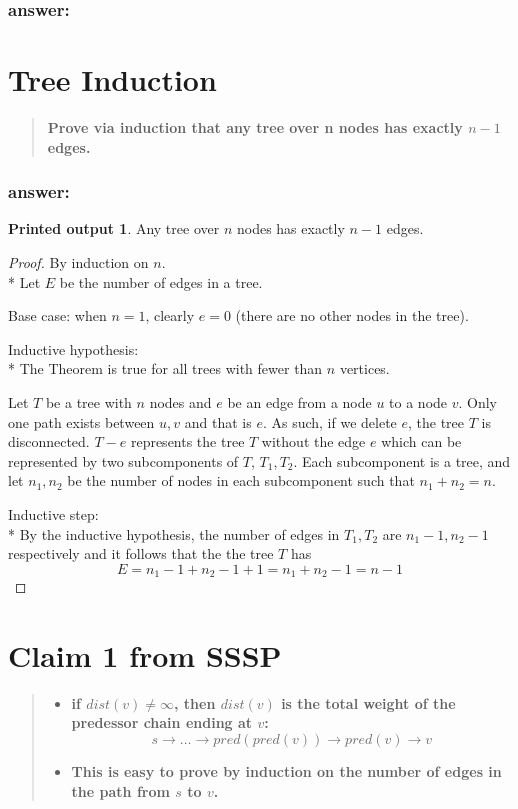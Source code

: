 \documentclass[titlepage]{article}\usepackage[]{graphicx}\usepackage[]{color}
\theoremstyle{definition}
\newtheorem{name}{Printed output}
\begin{document}
\subsubsection{answer:}
\vspace{8cm}


\section{Tree Induction}
\begin{quote}
  \textbf{Prove via induction that any tree over n nodes has exactly $n-1$
  edges. }
\end{quote}

\subsubsection{answer:}

\newtheorem{mydef}{Theorem}

\begin{name}
  Any tree over $n$ nodes has exactly $n-1$ edges.
\end{name}


\begin{proof}
By induction on $n$. \\*
Let $E$ be the number of edges in a tree.

Base case: when $n =1$, clearly $e = 0$ (there are no other nodes in the tree).

Inductive hypothesis: \\*
The Theorem is true for all trees with fewer than $ n$ vertices.

Let $T$ be a tree with $n$ nodes and $e$ be an edge from a node $u$ to a node
$v$. Only one path exists between $u,v$ and that is $e$. As such, if we delete $e$, the
tree $T$ is disconnected. $T - e$ represents the tree $T$ without the edge $e$
which can be represented by two subcomponents of $T$, $T_1, T_2$. Each
subcomponent is a tree, and let $n_1,n_2$ be the number of nodes in each
subcomponent such that $n_1 + n_2 = n$. 

Inductive step: \\*
By the inductive hypothesis, the number of edges in $T_1, T_2$ are $n_1-1,
n_2-1$
respectively and it follows that the the tree $T$ has 
\[ E = n_1 -1 + n_2 -1 +1 = n_1 + n_2-1 = n-1 \]
  \qedhere
\end{proof}


\section{Claim 1 from SSSP}
\begin{quote}
\begin{itemize}
  \item \textbf{if $dist(v) \neq \infty $, then $dist(v)$ is the total weight
	of the predessor chain ending at $v$:
  \[ s \rightarrow \dots \rightarrow pred(pred(v)) \rightarrow pred(v) \rightarrow v \] }
  \item \textbf{This is easy to prove by induction on the number of edges in
	the path from $s$ to $v$.}
\end{itemize}
\end{quote}
\end{document}

